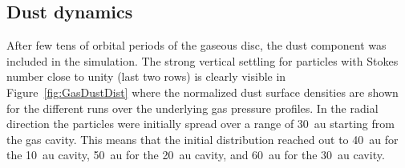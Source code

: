 \documentclass[fleqn,usenatbib]{mnras}
\begin{document}
    \subsection{Dust dynamics} \label{sec:results-dust}
        After few tens of orbital periods of the gaseous disc, the dust component was included in the simulation.
        The strong vertical settling for particles with Stokes number close to unity (last two rows) is clearly visible in Figure~\ref{fig:GasDustDist} where the normalized dust surface densities are shown for the different runs over the underlying gas pressure profiles.
        In the radial direction the particles were initially spread over a range of \SI{30}{au} starting from the gas cavity. This means that the initial distribution reached out to \SI{40}{au} for the \SI{10}{au} cavity, \SI{50}{au} for the \SI{20}{au} cavity, and \SI{60}{au} for the \SI{30}{au} cavity.
\end{document}
